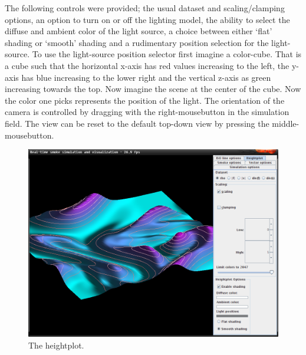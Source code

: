 \documentclass[a4paper,11pt,twoside]{report}
\begin{document}
		The following controls were provided; the usual dataset and scaling/clamping options, an option to turn on or off the lighting model, the ability to select the diffuse and ambient color of the light source, a choice between either `flat' shading or `smooth' shading and a rudimentary position selection for the light-source. To use the light-source position selector first imagine a color-cube. That is a cube such that the horizontal x-axis has red values increasing to the left, the y-axis has blue increasing to the lower right and the vertical z-axis as green increasing towards the top. Now imagine the scene at the center of the cube. Now the color one picks represents the position of the light.
		The orientation of the camera is controlled by dragging with the right-mousebutton in the simulation field. The view can be reset to the default top-down view by pressing the middle-mousebutton.
		\begin{figure}[h]
		\centering
		\includegraphics[scale=\imagescalefactor]{images/step6.png}
		\caption{The heightplot.}\label{fig:step6}
		\end{figure}
		\clearpage
\end{document}
